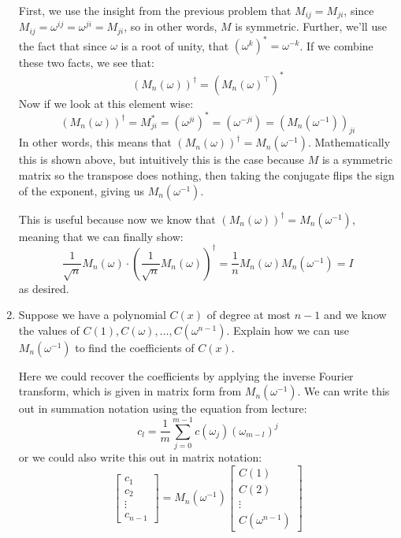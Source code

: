 \documentclass[11pt]{article}
\begin{document}
\begin{enumerate}[label=(\alph*), resume]
	\begin{solution}
		First, we use the insight from the previous problem that $M_{ij} = M_{ji}$, since $M_{ij} = 
		\omega^{ij} = \omega^{ji} = M_{ji}$, so in other words, $M$ is symmetric. Further, we'll use 
		the fact that since $\omega$ is a root of unity, that $(\omega^k)^* = \omega^{-k}$. If we combine
		these two facts, we see that:
		\[
			(M_n(\omega))^\dagger = (M_n(\omega)^\top )^*
		\] 
		Now if we look at this element wise:
		\[
			(M_n(\omega))^\dagger = M_{ji}^* = (\omega^{ji})^* = (\omega^{-ji}) = (M_n(\omega^{-1}))_{ji}
		\] 
		In other words, this means that $(M_n(\omega))^\dagger = M_n(\omega^{-1})$. Mathematically this is 
		shown above, but intuitively this is the case because $M$ is a symmetric matrix so the transpose
		does nothing, then taking the conjugate flips the sign of the exponent, giving us $M_n(\omega^{-1})$. 

		This is useful because now we know that $(M_n(\omega))^\dagger = M_n(\omega^{-1})$, meaning that
		we can finally show: 
		\[
			\frac{1}{\sqrt{n}} M_n(\omega) \cdot \left(\frac{1}{\sqrt{n} } M_n(\omega)\right)^\dagger 
			= \frac{1}{n}M_n(\omega) M_n(\omega^{-1}) = I
		\] 
		as desired.
	\end{solution}
\item Suppose we have a polynomial $C(x)$ of degree at most $n - 1$ and we know the values of $C(1), C(\omega), \ldots, C(\omega^{n-1})$. Explain how we can use $M_n(\omega^{-1})$ to find the coefficients of $C(x)$.

	\begin{solution}
		Here we could recover the coefficients by applying the inverse Fourier transform, which 
		is given in matrix form from $M_n(\omega^{-1})$. We can write this out in summation notation using 
		the equation from lecture:
		\[
			c_l = \frac{1}{m}\sum_{j =0}^{m-1} c(\omega_j) (\omega_{m - l})^j
		\] 
		or we could also write this out in matrix notation:
		\[
			\begin{bmatrix} c_1 \\ c_2 \\ \vdots \\c_{n-1} \end{bmatrix} = M_n(\omega^{-1}) \begin{bmatrix} C(1) \\ C(2) \\ \vdots \\ C(\omega^{n-1}) \end{bmatrix} 
		\] 
	\end{solution}


\end{enumerate}
\end{document}
